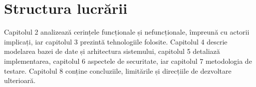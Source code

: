 \section{Structura lucrării}

Capitolul 2 analizează cerințele funcționale și nefuncționale, împreună cu actorii
implicați, iar capitolul 3 prezintă tehnologiile folosite. Capitolul 4 descrie
modelarea bazei de date și arhitectura sistemului, capitolul 5 detaliază
implementarea, capitolul 6 aspectele de securitate, iar capitolul 7 metodologia de
testare. Capitolul 8 conține concluziile, limitările și direcțiile de dezvoltare
ulterioară.
